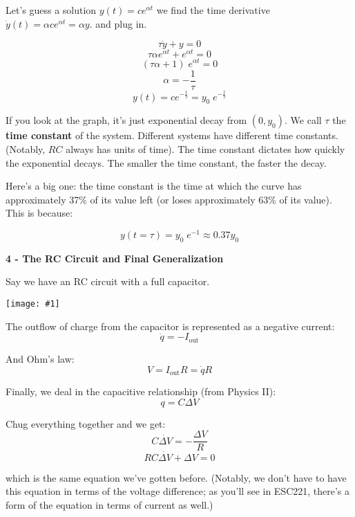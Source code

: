 \documentclass{article}
\newcommand{\bicture}[1]{\begin{center}
    {\texttt{[image: \#1]}}
\end{center}}
\begin{document}
\begin{onehalfspacing}
\begin{flushleft}
\medskip

Let's guess a solution \(y(t) = ce^{\alpha t}\) we find the time derivative \(\dot{y}(t) = \alpha ce^{\alpha t} = \alpha y\). and plug in.

\vspace{-0.1in}
\[\tau \dot{y} + y = 0\]
\[\tau \alpha e^{\alpha t} + e^{\alpha t} = 0\]
\[(\tau \alpha + 1) \; e^{\alpha t} = 0\]
\[\alpha = -\frac{1}{\tau}\]
\[y(t) = ce^{-\frac{t}{\tau}} = y_0 \; e^{-\frac{t}{\tau}}\]

If you look at the graph, it's just exponential decay from \((0, y_0)\). We call \(\tau\) the \textbf{time constant} of the system. Different systems have different time constants. (Notably, \(RC\) always has units of time). The time constant dictates how quickly the exponential decays. The smaller the time constant, the faster the decay.

\medskip

Here's a big one: the time constant is the time at which the curve has approximately 37\% of its value left (or loses approximately 63\% of its value). This is because:

\vspace{-0.1in}
\[y(t=\tau) = y_0 \; e^{-1} \approx 0.37 y_0\]

\bigskip
\large\textbf{4 - The RC Circuit and Final Generalization} \\
\normalsize

Say we have an RC circuit with a full capacitor. 

\bicture{2_rc}

The outflow of charge from the capacitor is represented as a negative current:
\vspace{-0.1in}
\[\dot{q} = -I_\text{out}\]

And Ohm's law:
\vspace{-0.1in}
\[V = I_\text{out} R = \dot{q} R\]

Finally, we deal in the capacitive relationship (from Physics II):
\vspace{-0.1in}
\[q = C\Delta V\]

Chug everything together and we get:
\vspace{-0.1in}
\[C\dot{\Delta V} = -\frac{\Delta V}{R}\]
\[\boxed{RC \dot{\Delta V} + \Delta V = 0}\]

which is the same equation we've gotten before. (Notably, we don't have to have this equation in terms of the voltage difference; as you'll see in ESC221, there's a form of the equation in terms of current as well.)


\end{flushleft}
\end{onehalfspacing}
\end{document}
